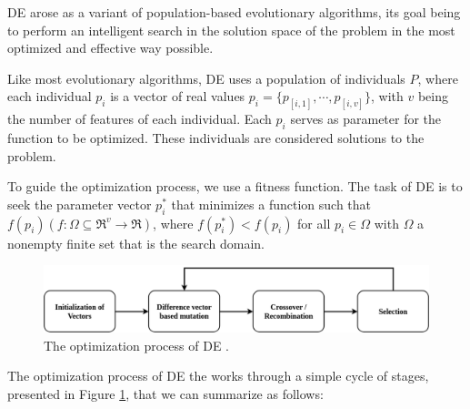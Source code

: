 \documentclass[review]{elsarticle}
\begin{document}
DE arose as a variant of population-based evolutionary algorithms, its goal being to perform an intelligent search in the solution space of the problem in the most optimized and effective way possible.

Like most evolutionary algorithms, DE uses a population of individuals $P$, where each individual $p_i$ is a vector of real values $p_i = \{p_{[i,1]},\cdots,p_{[i,v]}\}$, with $v$ being the number of features of each individual. Each $p_i$ serves as parameter for the function to be optimized. These individuals are considered solutions to the problem.

To guide the optimization process, we use a fitness function. The task of DE is to seek the parameter vector $p_i^*$ that minimizes a function such that $f(p_i)(f: \Omega \subseteq \mathfrak{R}^{v} \rightarrow \mathfrak{R})$, where $f(p_i^*) < f(p_i)$ for all $p_i \in \Omega$ with $\Omega$ a nonempty finite set that is the search domain.

\begin{figure}[!h]
	\centering
	\includegraphics[scale=0.3]{Figures/DEop.png}
	\caption{The optimization process of DE \cite{das2011differential}.}\label{img:DE}
\end{figure}

The optimization process of DE the works through a simple cycle of stages, presented in Figure \ref{img:DE}, that we can summarize as follows:
\end{document}
